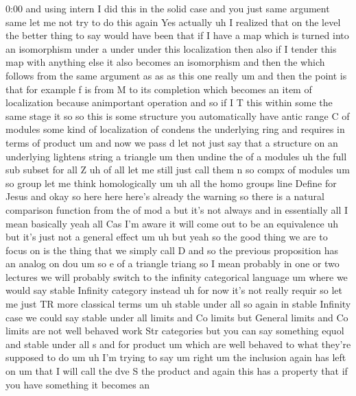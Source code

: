 \begin{unfinished}{0:00}
and  using  intern  I  did  this  in  the  solid
case  and  you  just  same  argument
same  let  me  not  try  to  do  this
again  Yes  actually  uh  I  realized  that  on
the  level  the  better  thing  to  say  would
have  been  that  if  I  have  a  map  which  is
turned  into  an  isomorphism  under
a  under  under  this  localization  then
also  if  I  tender  this  map  with  anything
else  it  also  becomes  an  isomorphism  and
then  the  which  follows  from  the  same
argument  as  as  as  this  one  really  um  and
then  the  point  is  that  for  example  f  is
from  M  to  its
completion  which  becomes  an  item  of
localization  because  animportant
operation  and  so  if  I  T  this
within  some  the  same  stage
it
so
so  this  is  some  structure  you
automatically  have  antic  range  C  of
modules  some  kind  of  localization  of
condens  the  underlying  ring  and  requires
in  terms  of  product
um  and  now  we  pass
d
let  not  just  say  that  a
structure  on  an  underlying  lightens
string  a
triangle
um  then  undine  the  of  a  modules
uh  the  full  sub  subset  for
all  Z
uh  of  all  let  me  still  just  call  them
n  so  compx  of  modules  um  so
group  let  me  think
homologically
um  uh  all  the  homo
groups  line
Define  for
Jesus
and  okay  so  here  here  here's  already  the
warning  so  there  is  a  natural  comparison
function  from
the  of  mod
a  but  it's  not
always
and  in  essentially  all  I  mean  basically
yeah  all  Cas  I'm  aware  it  will  come  out
to  be  an  equivalence  uh  but  it's  just
not  a  general  effect
um
uh  but  yeah  so  the  good  thing  we  are  to
focus  on  is  the  thing  that  we  simply
call
D  and  so  the  previous  proposition
has  an  analog  on
dou
um
so  e  of
a
triangle
triang  so  I  mean  probably  in  one  or  two
lectures  we  will  probably  switch  to  the
infinity  categorical
language  um  where  we  would  say  stable
Infinity  category  instead  uh  for  now
it's  not  really  requir  so  let  me  just  TR
more  classical  terms
um  uh  stable  under  all  so  again  in
stable  Infinity  case  we  could  say  stable
under  all  limits  and  Co  limits  but
General  limits  and  Co  limits  are  not
well  behaved  work  Str  categories  but  you
can  say  something  equol  and  stable
under  all  s  and  for
product
um  which  are  well  behaved  to  what
they're  supposed  to  do
um
uh  I'm  trying  to
say
um  right  um
the
inclusion  again  has  left
on  um  that  I  will
call  the  dve  S  the
product
and  again  this  has  a  property  that  if
you  have  something  it  becomes  an

\end{unfinished}
